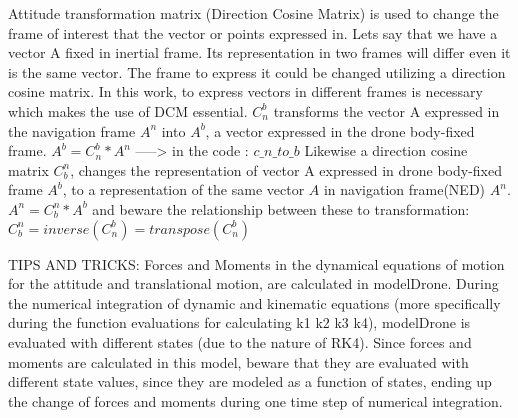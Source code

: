Attitude transformation matrix (Direction Cosine Matrix) is used to change the frame of interest that the vector or points expressed in. Lets say that we have a vector A fixed in inertial frame. Its representation in two frames will differ even it is the same vector. The frame to express it could be changed utilizing a direction cosine matrix. In this work, to express vectors in different frames is necessary which makes the use of DCM essential. $C_n^b$ transforms the vector A expressed in the navigation frame $A^n$ into $A^b$, a vector expressed in the drone body-fixed frame. $A^b = C_n^b * A^n$ -----> in the code : $c\_n\_to\_b$ Likewise a direction cosine matrix $C_b^n$, changes the representation of vector A expressed in drone body-fixed frame $A^b$, to a representation of the same vector $A$ in navigation frame(NED) $A^n$. $A^n = C_b^n * A^b$ and beware the relationship between these to transformation: $C_b^n = inverse(C_n^b) = transpose(C_n^b)$

TIPS AND TRICKS: Forces and Moments in the dynamical equations of motion for the attitude and translational motion, are calculated in modelDrone. During the numerical integration of dynamic and kinematic equations (more specifically during the function evaluations for calculating k1 k2 k3 k4), modelDrone is evaluated with different states (due to the nature of RK4). Since forces and moments are calculated in this model, beware that they are evaluated with different state values, since they are modeled as a function of states, ending up the change of forces and moments during one time step of numerical integration.

\clearpage
\newpage


